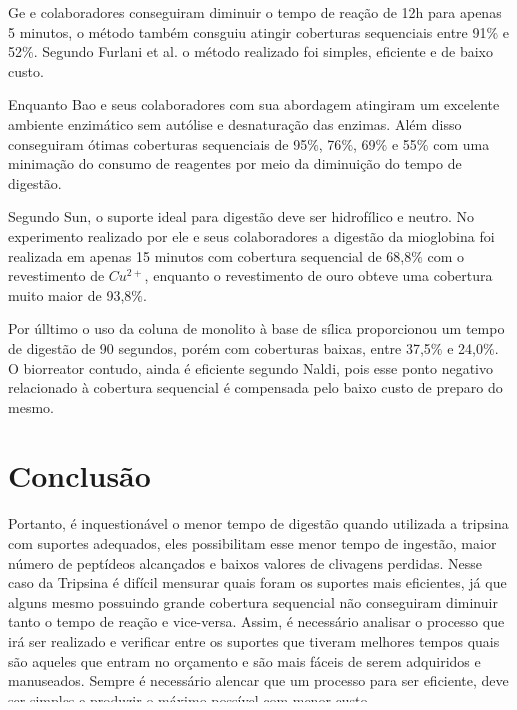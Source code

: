 \documentclass[
	12pt,				%
	openright,			%
	oneside,			%
	a4paper,			%
	english,			%
	french,				%
	spanish,			%
	brazil				%
	]{abntex2}
\begin{document}
Ge e colaboradores conseguiram diminuir o tempo de reação de 12h para apenas 5 minutos, o método também consguiu atingir coberturas sequenciais entre 91$\%$ e 52$\%$. Segundo Furlani et al. o método realizado foi simples, eficiente e de baixo custo.

Enquanto Bao e seus colaboradores com sua abordagem atingiram um excelente ambiente enzimático sem autólise e desnaturação das enzimas. Além disso conseguiram ótimas coberturas sequenciais de 95$\%$, 76$\%$, 69$\%$ e 55$\%$ com uma minimação do consumo de reagentes por meio da diminuição do tempo de digestão.

Segundo Sun, o suporte ideal para digestão deve ser hidrofílico e neutro. No experimento realizado por ele e seus colaboradores a digestão da mioglobina foi realizada em apenas 15 minutos com cobertura sequencial de 68,8$\%$ com o revestimento de $Cu^{2+}$, enquanto o revestimento de ouro obteve uma cobertura muito maior de 93,8$\%$.

Por úlltimo o uso da coluna de monolito à base de sílica proporcionou um tempo de digestão de 90 segundos, porém com coberturas baixas, entre 37,5$\%$ e 24,0$\%$. O biorreator contudo, ainda é eficiente segundo Naldi, pois esse ponto negativo relacionado à cobertura sequencial é compensada pelo baixo custo de preparo do mesmo.

\newpage
\section{Conclusão}
\pagestyle{fancy}

Portanto, é inquestionável o menor tempo de digestão quando utilizada a tripsina com suportes adequados, eles possibilitam esse menor tempo de ingestão, maior número de peptídeos alcançados e baixos valores de clivagens perdidas. Nesse caso da Tripsina é difícil mensurar quais foram os suportes mais eficientes, já que alguns mesmo possuindo grande cobertura sequencial não conseguiram diminuir tanto o tempo de reação e vice-versa. Assim, é necessário analisar o processo que irá ser realizado e verificar entre os suportes que tiveram melhores tempos quais são aqueles que entram no orçamento e são mais fáceis de serem adquiridos e manuseados. Sempre é necessário alencar que um processo para ser eficiente, deve ser simples e produzir o máximo possível com menor custo. 

Segundo Furlani et al. a automação deve melhorar ainda mais esse processo de escolha dos suportes pois proporcionará uma maior reprodutibilidade dos processos de digestão e um controle melhor de todo o ciclo. Assim é interessante concluir que esses experimentos para escolha de suportes e imobilizadores são essenciais para continuar aumentando a eficiência de processos e diminuindo os seus custos, pois sempre é possível testar algo novo, sendo um novo suporte ou algum modo novo de preparar ou organizar esse suporte com a enzima. Espera-se que novos suportes sejam desenvolvidos e que sejam ainda mais compatíveis com as enzimas e células alvo.

\newpage
\postextual


\end{document}
